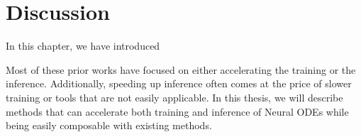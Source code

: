 \section{Discussion}
\label{sec:discussion_neural_ode}

In this chapter, we have introduced 

Most of these prior works have focused on either accelerating the training or the inference. Additionally, speeding up inference often comes at the price of slower training or tools that are not easily applicable. In this thesis, we will describe methods that can accelerate both training and inference of Neural ODEs while being easily composable with existing methods.
